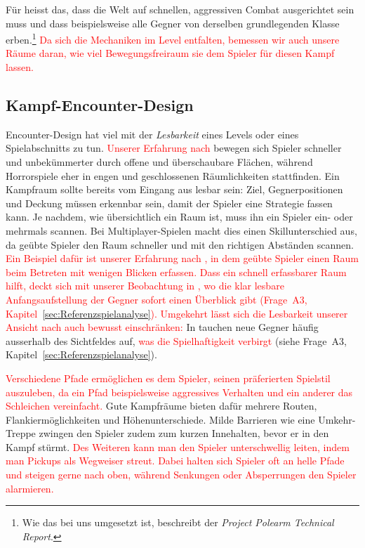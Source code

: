\documentclass[../Main.tex]{subfiles}
\begin{document}
Für  heisst das, dass die Welt auf schnellen, aggressiven Combat ausgerichtet sein muss und dass beispielsweise alle Gegner von derselben grundlegenden Klasse erben.\textcolor{red}{\footnote{Wie das bei uns umgesetzt ist, beschreibt der \textit{Project Polearm Technical Report}.}} \textcolor{red}{Da sich die Mechaniken im Level entfalten, bemessen wir auch unsere Räume daran, wie viel Bewegungsfreiraum sie dem Spieler für diesen Kampf lassen.}

\subsection{Kampf-Encounter-Design} \label{sec:Encounter}
Encounter-Design hat viel mit der \textit{Lesbarkeit} eines Levels oder eines Spielabschnitts zu tun. \textcolor{red}{Unserer Erfahrung nach} bewegen sich Spieler schneller und unbekümmerter durch offene und überschaubare Flächen, während Horrorspiele eher in engen und geschlossenen Räumlichkeiten stattfinden. Ein Kampfraum sollte bereits vom Eingang aus lesbar sein: Ziel, Gegnerpositionen und Deckung müssen erkennbar sein, damit der Spieler eine Strategie fassen kann.\autocite{gdc_horizonquests2018} Je nachdem, wie übersichtlich ein Raum ist, muss ihn ein Spieler ein- oder mehrmals scannen. Bei Multiplayer-Spielen macht dies einen Skillunterschied aus, da geübte Spieler den Raum schneller und mit den richtigen Abständen scannen.\autocite[122--123]{totten2014architectural} \textcolor{red}{Ein Beispiel dafür ist unserer Erfahrung nach ,\autocite{valve_counterstrike_2000} in dem geübte Spieler einen Raum beim Betreten mit wenigen Blicken erfassen. Dass ein schnell erfassbarer Raum hilft, deckt sich mit unserer Beobachtung in , wo die klar lesbare Anfangsaufstellung der Gegner sofort einen Überblick gibt (Frage~A3, Kapitel~\ref{sec:Referenzspielanalyse}).} \textcolor{red}{Umgekehrt lässt sich die Lesbarkeit unserer Ansicht nach auch bewusst einschränken:} In  tauchen neue Gegner häufig ausserhalb des Sichtfeldes auf, \textcolor{red}{was die Spielhaftigkeit verbirgt} (siehe Frage~A3, Kapitel~\ref{sec:Referenzspielanalyse}).

\textcolor{red}{Verschiedene Pfade ermöglichen es dem Spieler, seinen präferierten Spielstil auszuleben, da ein Pfad beispielsweise aggressives Verhalten und ein anderer das Schleichen vereinfacht.\autocite{gdc_tenprinciples2010}} Gute Kampfräume bieten dafür mehrere Routen, Flankiermöglichkeiten und Höhenunterschiede. Milde Barrieren wie eine Umkehr-Treppe zwingen den Spieler zudem zum kurzen Innehalten, bevor er in den Kampf stürmt.\autocite{gdc_horizonquests2018} \textcolor{red}{Des Weiteren kann man den Spieler unterschwellig leiten, indem man Pickups als Wegweiser streut. Dabei halten sich Spieler oft an helle Pfade und steigen gerne nach oben, während Senkungen oder Absperrungen den Spieler alarmieren.\autocite[240, 245, 251]{rogers2014levelup}}
\end{document}
